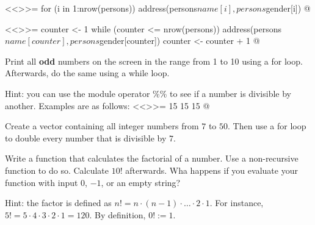 \documentclass
[answers]
{exercise_sheet}
\begin{document}
\makeatletter\if@answers\begin{Answer}{10}
<<>>=
for (i in 1:nrow(persons)) {
  address(persons$name[i], persons$gender[i])
}
@

<<>>=
counter <- 1
while (counter <= nrow(persons)) {
  address(persons$name[counter], persons$gender[counter])
  counter <- counter + 1
}
@
\end{Answer}\fi\makeatother

\begin{Question}{6}
Print all \textbf{odd} numbers on the screen in the range from 1 to 10 using a for loop. Afterwards, do the same using a while loop.

Hint: you can use the module operator \%\% to see if a number is divisible by another. Examples are as follows:
<<>>=
15 %
15 %
15 %
@
\end{Question}

\makeatletter\if@answers{}\fi\makeatother

\begin{Question}{4}
Create a vector containing all integer numbers from $7$ to $50$. Then use a for loop to double every number that is divisible by $7$.
\end{Question}

\makeatletter\if@answers{}\fi\makeatother

\begin{Question}{8}
Write a function that calculates the factorial of a number. Use a non-recursive function to do so. Calculate $10!$ afterwards. Wha happens if you evaluate your function with input $0$, $-1$, \verb@NA@ or an empty string?

Hint: the factor is defined as $n! = n \cdot (n-1) \cdot \ldots \cdot 2 \cdot 1$. For instance, $5! = 5 \cdot 4 \cdot 3 \cdot 2 \cdot 1 = 120$. By definition, $0! := 1$. 
\end{Question}
\end{document}
